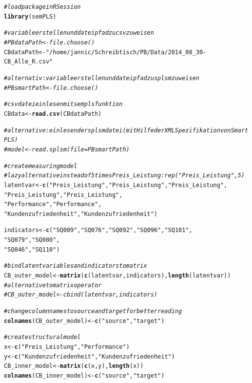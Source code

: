 \documentclass{article}\usepackage[]{graphicx}\usepackage[]{color}
\makeatletter
\newcommand{\hlstr}[1]{\textcolor[rgb]{0.192,0.494,0.8}{#1}}%
\newcommand{\hlcom}[1]{\textcolor[rgb]{0.678,0.584,0.686}{\textit{#1}}}%
\newcommand{\hlstd}[1]{\textcolor[rgb]{0.345,0.345,0.345}{#1}}%
\newcommand{\hlkwb}[1]{\textcolor[rgb]{0.69,0.353,0.396}{#1}}%
\newcommand{\hlkwd}[1]{\textcolor[rgb]{0.737,0.353,0.396}{\textbf{#1}}}%
\newenvironment{kframe}{%
 \def\at@end@of@kframe{}%
 \ifinner\ifhmode%
  \def\at@end@of@kframe{\end{minipage}}%
  \begin{minipage}{\columnwidth}%
 \fi\fi%
 \def\FrameCommand##1{\hskip\@totalleftmargin \hskip-\fboxsep
 \colorbox{shadecolor}{##1}\hskip-\fboxsep
     \hskip-\linewidth \hskip-\@totalleftmargin \hskip\columnwidth}%
 \MakeFramed {\advance\hsize-\width
   \@totalleftmargin\z@ \linewidth\hsize
   \@setminipage}}%
 {\par\unskip\endMakeFramed%
 \at@end@of@kframe}
\newenvironment{knitrout}{}{} %
\makeatother
\begin{document}
\begin{knitrout}
\color{fgcolor}\begin{kframe}
\begin{alltt}
\hlcom{#load package in R Session}
\hlkwd{library}\hlstd{(semPLS)}

\hlcom{# variable erstellen und dateipfad zu csv zuweisen}
\hlcom{#PBdataPath <- file.choose()}
\hlstd{CBdataPath} \hlkwb{<-} \hlstr{"/home/jannic/Schreibtisch/PB/Data/2014_08_30-CB_Alle_R.csv"}

\hlcom{# alternativ: variable erstellen und dateipfad zu splsm zuweisen}
\hlcom{#PBsmartPath <- file.choose()}

\hlcom{#csv datei einlesen mit sempls funktion}
\hlstd{CBdata} \hlkwb{<-} \hlkwd{read.csv}\hlstd{(CBdataPath)}

\hlcom{# alternative: einlesen der splsm datei (mit Hilfe der XML Spezifikation von SmartPLS)}
\hlcom{#model <- read.splsm(file=PBsmartPath)}

\hlcom{#create measuring model}
\hlcom{#lazy alternative instead of 5 times Preis_Leistung: rep("Preis_Leistung",5)}
\hlstd{latentvar} \hlkwb{<-} \hlkwd{c}\hlstd{(}\hlstr{"Preis_Leistung"}\hlstd{,}\hlstr{"Preis_Leistung"}\hlstd{,}\hlstr{"Preis_Leistung"}\hlstd{,}
               \hlstr{"Preis_Leistung"}\hlstd{,}\hlstr{"Preis_Leistung"}\hlstd{,}
              \hlstr{"Performance"}\hlstd{,}\hlstr{"Performance"}\hlstd{,}
              \hlstr{"Kundenzufriedenheit"}\hlstd{,}\hlstr{"Kundenzufriedenheit"}\hlstd{)}

\hlstd{indicators} \hlkwb{<-} \hlkwd{c}\hlstd{(}\hlstr{"SQ009"}\hlstd{,}\hlstr{"SQ076"}\hlstd{,}\hlstr{"SQ092"}\hlstd{,}\hlstr{"SQ096"}\hlstd{,}\hlstr{"SQ101"}\hlstd{,}
                \hlstr{"SQ079"}\hlstd{,}\hlstr{"SQ080"}\hlstd{,}
               \hlstr{"SQ046"}\hlstd{,}\hlstr{"SQ110"}\hlstd{)}

\hlcom{#bind latent variables and indicators to matrix}
\hlstd{CB_outer_model} \hlkwb{<-} \hlkwd{matrix}\hlstd{(}\hlkwd{c}\hlstd{(latentvar,indicators),}\hlkwd{length}\hlstd{(latentvar))}
\hlcom{#alternative to matrix operator}
\hlcom{#CB_outer_model <- cbind(latentvar,indicators)}

\hlcom{#change column names to source and target for better reading}
\hlkwd{colnames}\hlstd{(CB_outer_model)} \hlkwb{<-} \hlkwd{c}\hlstd{(}\hlstr{"source"}\hlstd{,}\hlstr{"target"}\hlstd{)}

\hlcom{#create structural model}
\hlstd{x} \hlkwb{<-} \hlkwd{c}\hlstd{(}\hlstr{"Preis_Leistung"}\hlstd{,}\hlstr{"Performance"}\hlstd{)}
\hlstd{y} \hlkwb{<-} \hlkwd{c}\hlstd{(}\hlstr{"Kundenzufriedenheit"}\hlstd{,}\hlstr{"Kundenzufriedenheit"}\hlstd{)}
\hlstd{CB_inner_model} \hlkwb{<-} \hlkwd{matrix}\hlstd{(}\hlkwd{c}\hlstd{(x,y),}\hlkwd{length}\hlstd{(x))}
\hlkwd{colnames}\hlstd{(CB_inner_model)} \hlkwb{<-} \hlkwd{c}\hlstd{(}\hlstr{"source"}\hlstd{,}\hlstr{"target"}\hlstd{)}


\end{alltt}
\end{kframe}
\end{knitrout}
\end{document}
